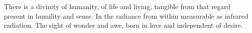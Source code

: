 

There is a divinity of humanity, of life and living, tangible from
that regard present in humility and sense.  In the radiance from
within measurable as infrared radiation.  The sight of wonder and awe,
born in love and independent of desire.  

\bye
